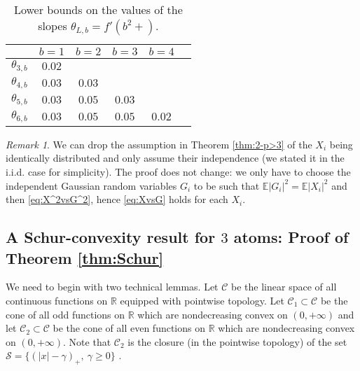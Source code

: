 \documentclass[10pt]{article}
\newcommand{\E}{\mathbb{E}}
\newcommand{\1}{\textbf{1}}
\newcommand{\R}{\mathbb{R}}
\theoremstyle{remark}
\newtheorem{remark}[theorem]{Remark}
\theoremstyle{definition}
\begin{document}
\begin{table}[!ht]
\begin{center}
\caption{Lower bounds on the values of the slopes $\theta_{L,b} = f'(b^2+)$.}
\label{tab:f'}
\begin{tabular}{r|ccccc}
& $b=1$ & $b=2$ & $b=3$ & $b=4$ \\\hline
$\theta_{3,b}$ & $0.02$\\
$\theta_{4,b}$ & $0.03$ & $0.03$\\
$\theta_{5,b}$ & $0.03$ & $0.05$ & $0.03$\\
$\theta_{6,b}$ & $0.03$ & $0.05$ & $0.05$ & $0.02$\\
\end{tabular}
\end{center}
\end{table}


\begin{remark}\label{rem:iid-2-p>3}
We can drop the assumption in Theorem \ref{thm:2-p>3} of the $X_i$ being identically distributed and only assume their independence (we stated it in the i.i.d. case for simplicity). The proof does not change: we only have to choose the independent Gaussian random variables $G_i$ to be such that $\E|G_i|^2 = \E|X_i|^2$ and then \eqref{eq:X^2vsG^2}, hence \eqref{eq:XvsG} holds for each $X_i$.
\end{remark}


\subsection{A Schur-convexity result for $3$ atoms: Proof of Theorem \ref{thm:Schur}}


We need to begin with two technical lemmas. Let $\mathcal{C}$ be the linear space of all continuous functions on $\R$ equipped with pointwise topology. Let $\mathcal{C}_{1} \subset \mathcal{C}$ be the cone of all odd functions on $\R$ which are nondecreasing convex on $(0,+\infty)$ and let $\mathcal{C}_{2} \subset \mathcal{C}$ be the cone of all even functions on $\R$ which are nondecreasing convex on $(0,+\infty)$. Note that $\mathcal{C}_{2}$ is the closure (in the pointwise topology) of the set $\mathcal{S} = \{(|x|-\gamma)_+, \ \gamma \geq 0\}$ .
\end{document}
